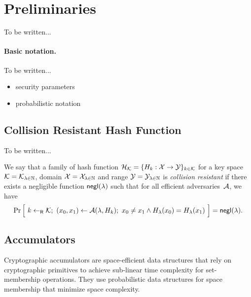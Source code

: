 \section{Preliminaries}

To be written...

\paragraph{Basic notation.}
\label{sec:notation}

To be written...
\begin{itemize}[noitemsep]
    \item security parameters
    \item probabilistic notation
\end{itemize}

\subsection{Collision Resistant Hash Function}

To be written...

\newcommand{\getsr}{\gets_{\ms{R}}}

\begin{definition}
    We say that a family of hash function $\mathcal{H}_{\mathcal{K}} = \{ H_k: \mathcal{X} \to
    \mathcal{Y} \}_{k \in \mathcal{K}}$ for a key space $\mathcal{K} = \mathcal{K}_{\lambda \in \mathbb{N}}$,
    domain $\mathcal{X} = \mathcal{X}_{\lambda \in \mathbb{N}}$ and range $\mathcal{Y} = \mathcal{Y}_{\lambda
    \in \mathbb{N}}$ is \emph{collision resistant} if there exists a negligible
    function $\mathsf{negl}(\lambda)$ such that for all efficient adversaries~$\mathcal{A}$,
    we have
    \[ \Pr\Big[~ k \getsr \calK;~ (x_0, x_1) \gets \calA(\lambda, H_k);~
    x_0 \neq x_1 \land H_\lambda(x_0) = H_\lambda(x_1) ~\Big] = \negl(\lambda)
.\]
\end{definition}

\subsection{Accumulators}
Cryptographic accumulators are space-efficient data structures that rely on 
cryptographic primitives to achieve sub-linear time complexity for set-membership 
operations. They use probabilistic data structures for space membership that 
minimize space complexity. 

\newcommand{\Piacc}{\Pi_\ms{acc}}

